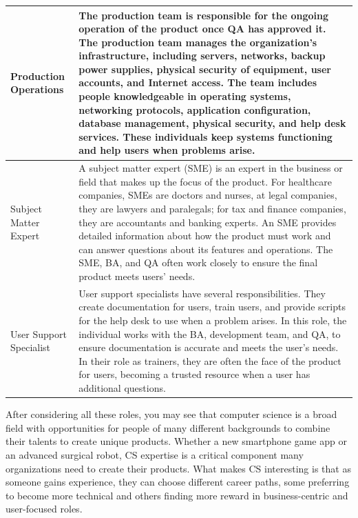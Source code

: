 \begin{longtable}[H]{p{.8in}|p{3.6in}}
	\hline
	\Tstrut Production Operations  & The production team is responsible for the ongoing operation of the product once QA has approved it. The production team manages the organization's infrastructure, including servers, networks, backup power supplies, physical security of equipment, user accounts, and Internet access. The team includes people knowledgeable in operating systems, networking protocols, application configuration, database management, physical security, and help desk services. These individuals keep systems functioning and help users when problems arise.\\
	\hline
	\Tstrut Subject \linebreak Matter \linebreak Expert & A subject matter expert (SME) is an expert in the business or field that makes up the focus of the product. For healthcare companies, SMEs are doctors and nurses, at legal companies, they are lawyers and paralegals; for tax and finance companies, they are accountants and banking experts. An SME provides detailed information about how the product must work and can answer questions about its features and operations. The SME, BA, and QA often work closely to ensure the final product meets users' needs.\\
	\hline
	\Tstrut User \linebreak Support \linebreak Specialist & User support specialists have several responsibilities. They create documentation for users, train users, and provide scripts for the help desk to use when a problem arises. In this role, the individual works with the BA, development team, and QA, to ensure documentation is accurate and meets the user's needs. In their role as trainers, they are often the face of the product for users, becoming a trusted resource when a user has additional questions.\\ 
	\bottomrule
\end{longtable}


After considering all these roles, you may see that computer science is a broad field with opportunities for people of many different backgrounds to combine their talents to create unique products. Whether a new smartphone game app or an advanced surgical robot, CS expertise is a critical component many organizations need to create their products. What makes CS interesting is that as someone gains experience, they can choose different career paths, some preferring to become more technical and others finding more reward in business-centric and user-focused roles.

